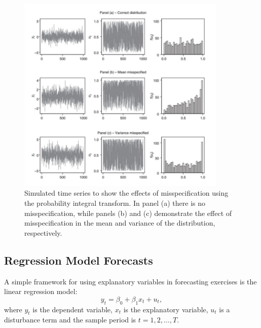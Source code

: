 \documentclass[11pt]{article}
\begin{document}
\begin{figure}[h]
    \centering
    \includegraphics[width=10cm]{pics/PIT misspecification.png}
    \caption{Simulated time series to show the effects of misspecification using the probability integral transform. In panel (a) there is no misspecification, while panels (b) and (c) demonstrate the effect of misspecification in the mean and variance of the distribution, respectively.}
    \label{fig:effects of misspecification PIT}
\end{figure}
\newpage

\subsection{Regression Model Forecasts}

A simple framework for using explanatory variables in forecasting exercises is the linear regression model:
\[ y_t = \beta_0 + \beta_1 x_t + u_t,\]
where $y_t$ is the dependent variable, $x_t$ is the explanatory variable, $u_t$ is a disturbance term and the sample period is $t=1,2,\ldots,T$.
\end{document}
